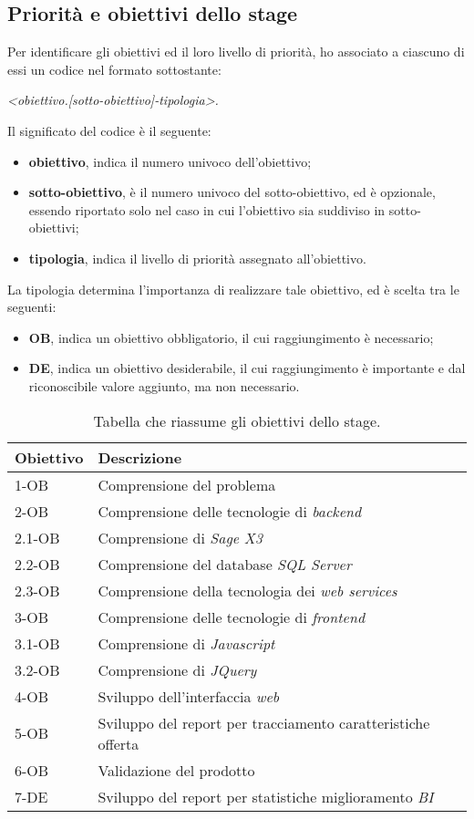 \subsection{Priorità e obiettivi dello stage}
Per identificare gli obiettivi ed il loro livello di priorità, ho associato a ciascuno di essi un codice nel formato sottostante:
\\
\begin{center}
	\textit{<obiettivo.[sotto-obiettivo]-tipologia>. }
\end{center}
Il significato del codice è il seguente:
\begin{itemize}
\item \textbf{obiettivo}, indica il numero univoco dell'obiettivo;
\item \textbf{sotto-obiettivo}, è il numero univoco del sotto-obiettivo, ed è opzionale, essendo riportato solo nel caso in cui l'obiettivo sia suddiviso in sotto-obiettivi;
\item \textbf{tipologia}, indica il livello di priorità assegnato all'obiettivo.
\end{itemize}
La tipologia determina l'importanza di realizzare tale obiettivo, ed è scelta tra le seguenti:
\begin{itemize}
	\item \textbf{OB}, indica un obiettivo obbligatorio, il cui raggiungimento è necessario;
	\item \textbf{DE}, indica un obiettivo desiderabile, il cui raggiungimento è importante e dal riconoscibile valore aggiunto, ma non necessario.
\end{itemize}

\begin{table}
\caption{Tabella che riassume gli obiettivi dello stage.}
\label{tab:requisiti-stage}
\begin{tabularx}{\textwidth}{lXl}
\hline\hline
\textbf{Obiettivo} & \textbf{Descrizione}\\
\hline
1-OB & Comprensione del problema\\
\hline
2-OB & Comprensione delle tecnologie di \textit{backend}\\
\hline
2.1-OB & Comprensione di \textit{Sage X3}\\
\hline
2.2-OB & Comprensione del database \textit{SQL Server}\\
\hline
2.3-OB & Comprensione della tecnologia dei \textit{web services}\\
\hline
3-OB & Comprensione delle tecnologie di \textit{frontend}\\
\hline
3.1-OB & Comprensione di \textit{Javascript}\\
\hline
3.2-OB & Comprensione di \textit{JQuery}\\
\hline
4-OB & Sviluppo dell'interfaccia \textit{web}\\
\hline
5-OB & Sviluppo del report per tracciamento caratteristiche offerta
\\
\hline
6-OB & Validazione del prodotto\\
\hline
7-DE & Sviluppo del report per statistiche miglioramento \textit{BI}\\
\hline
\end{tabularx}
\end{table}

